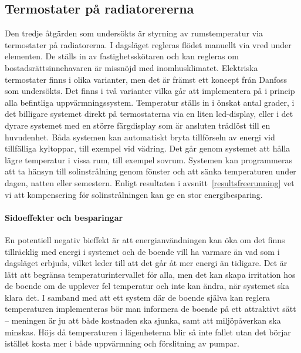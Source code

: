 \subsection{Termostater på radiatorererna}
Den tredje åtgärden som undersökts är styrning av rumstemperatur via termostater på radiatorerna. I dagsläget regleras flödet manuellt via vred under elementen. De ställs in av fastighetsskötaren och kan regleras om bostadsrättsinnehavaren är missnöjd med inomhusklimatet. Elektriska termostater finns i olika varianter, men det är främst ett koncept från Danfoss som undersökts. Det finns i två varianter vilka går att implementera på i princip alla befintliga uppvärmningssystem. Temperatur ställs in i önskat antal grader, i det billigare systemet direkt på termostaterna via en liten lcd-display, eller i det dyrare systemet med en större färgdisplay som är ansluten trådlöst till en huvudenhet. Båda systemen kan automatiskt bryta tillförseln av energi vid tillfälliga kyltoppar, till exempel vid vädring. Det går genom systemet att hålla lägre temperatur i vissa rum, till exempel sovrum. Systemen kan programmeras att ta hänsyn till solinstrålning genom fönster och att sänka temperaturen under dagen, natten eller semestern. Enligt resultaten i avsnitt~\ref{resultsfreerunning} vet vi att kompensering för solinstrålningen kan ge en stor energibesparing.

\paragraph{Sidoeffekter och besparingar}
En potentiell negativ bieffekt är att energianvändningen kan öka om det finns tillräcklig med energi i systemet och de boende vill ha varmare än vad som i dagsläget erbjuds, vilket leder till att det går åt mer energi än tidigare. Det är lätt att begränsa temperaturintervallet för alla, men det kan skapa irritation hos de boende om de upplever fel temperatur och inte kan ändra, när systemet ska klara det. I samband med att ett system där de boende själva kan reglera temperaturen implementeras bör man informera de boende på ett attraktivt sätt – meningen är ju att både kostnaden ska sjunka, samt att miljöpåverkan ska minskas. Höjs då temperaturen i lägenheterna blir så inte fallet utan det börjar istället kosta mer i både uppvärmning och förslitning av pumpar. \cite{viivilla}

